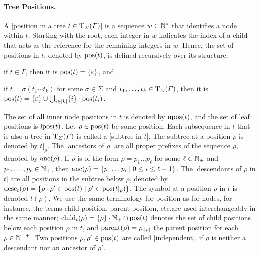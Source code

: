 \documentclass[../document.tex]{subfiles}
\begin{document}
    \paragraph{Tree Positions.}
    A [position in a tree \(t \in \operatorname{T}_\varSigma(\varGamma)\)] is a sequence $w \in \mathbb{N}^*$ that identifies a node within \(t\).
    Starting with the root, each integer in \(w\) indicates the index of a child that acts as the reference for the remaining integers in \(w\).
    Hence, the set of positions in \(t\), denoted by \(\operatorname{pos}(t)\), is defined recursively over its structure:
    \begin{inparaenum}
        \item if \(t \in \varGamma\), then it is \(\operatorname{pos}(t) = \{\varepsilon\}\), and
        \item if \(t = \sigma(t_1 \cdots t_k)\) for some \(\sigma\in \varSigma\) and \(t_1, \ldots, t_k \in \operatorname{T}_\varSigma(\varGamma)\), then it is \(\operatorname{pos}(t) = \{\varepsilon\} \cup \bigcup_{i\in[k]} \{i\}\cdot \operatorname{pos}(t_i)\).
    \end{inparaenum}
    The set of all inner node positions in \(t\) is denoted by \(\operatorname{npos}(t)\), and the set of leaf positions is \(\operatorname{lpos}(t)\).
    Let \(\rho \in \operatorname{pos}(t)\) be some position.
    Each subsequence in \(t\) that is also a tree in \(\operatorname{T}_\varSigma(\varGamma)\) is called a [subtree in \(t\)].
    The subtree at a position \(\rho\) is denoted by \(t|_\rho\).
    The [ancestors of \(\rho\)] are all proper prefixes of the sequence \(\rho\), denoted by \(\operatorname{anc}(\rho)\).
    If \(\rho\) is of the form \(\rho = p_1 \ldots p_\ell\) for some \(\ell \in \mathbb{N}_+\) and \(p_1, \ldots, p_\ell \in \mathbb{N}_+\), then \(\operatorname{anc}(\rho) = \{ p_1 \ldots p_i \mid 0 \leq i \leq \ell-1 \}\).
    The [descendants of \(\rho\) in \(t\)] are all positions in the subtree below \(\rho\), denoted by \(\operatorname{desc}_t(\rho) = \{ \rho \cdot \rho' \in \operatorname{pos}(t) \mid \rho' \in \operatorname{pos}(t|_\rho) \}\).
    The symbol at a position \(\rho\) in \(t\) is denoted  \(t(\rho)\).
    We use the same terminology for position as for nodes, for instance, the terms child position, parent position, etc.\@ are used interchangeably in the same manner; \(\operatorname{child}_t(\rho) = \{\rho\} \cdot \mathbb{N}_+ \cap \operatorname{pos}(t)\) denotes the set of child positions below each position \(\rho\) in \(t\), and \(\operatorname{parent}(\rho) = \rho_{:|\rho|}\) the parent position for each \(\rho \in {\ensuremath{\mathbb{N}}_+}^+\).
    Two positions \(\rho, \rho' \in \operatorname{pos}(t)\) are called [independent], if \(\rho\) is neither a descendant nor an ancestor of \(\rho'\).
\end{document}
